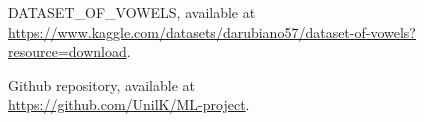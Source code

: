 \documentclass[letterpaper,12pt]{article}
\begin{document}
\begin{thebibliography}{99}
 DATASET\_OF\_VOWELS, available at \\ \href{https://www.kaggle.com/datasets/darubiano57/dataset-of-vowels?resource=download}{https://www.kaggle.com/datasets/darubiano57/dataset-of-vowels?resource=download}.

 Github repository, available at \\\href{https://github.com/UnilK/ML-project}{https://github.com/UnilK/ML-project}.
\end{thebibliography}
\end{document}
